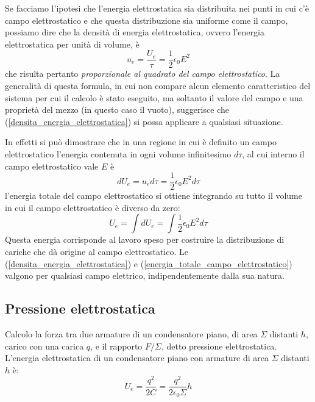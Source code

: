 \documentclass[class=book, crop=false, oneside, 12pt]{standalone}
\begin{document}
Se facciamo l'ipotesi che l'energia elettrostatica sia distribuita nei punti in cui c'è campo elettrostatico e che questa distribuzione sia uniforme come il campo, possiamo dire che la densità di energia elettrostatica, ovvero l'energia elettrostatica per unità di volume, è
\begin{equation} \label{densita_energia_elettrostatica}
    u_e = \frac{U_e}{\tau} = \frac{1}{2} \epsilon_0 E^2
\end{equation}
che risulta pertanto \emph{proporzionale al quadrato del campo elettrostatico}.  
La generalità di questa formula, in cui non compare alcun elemento caratteristico del sistema per cui il calcolo è stato eseguito, ma soltanto il valore del campo e una proprietà del mezzo (in questo caso il vuoto), suggerisce che (\ref{densita_energia_elettrostatica}) si possa applicare a qualsiasi situazione.

In effetti si può dimostrare che in una regione in cui è definito un campo elettrostatico l'energia contenuta in ogni volume infinitesimo \(d \tau\), al cui interno il campo elettrostatico vale \(E\) è 
\begin{equation*}
    d U_e = u_e d \tau = \frac{1}{2} \epsilon_0 E^2 d \tau
\end{equation*}
l'energia totale del campo elettrostatico si ottiene integrando su tutto il volume in cui il campo elettrostatico è diverso da zero: 
\begin{equation} \label{energia_totale_campo_elettrostatico}
    U_e = \int d U_e = \int \frac{1}{2} \epsilon_0 E^2 d \tau
\end{equation}
Questa energia corrisponde al lavoro speso per costruire la distribuzione di cariche che dà origine al campo elettrostatico. 
Le (\ref{densita_energia_elettrostatica}) e  (\ref{energia_totale_campo_elettrostatico}) valgono per qualsiasi campo elettrico, indipendentemente dalla sua natura.

\subsection{Pressione elettrostatica}

Calcolo la forza tra due armature di un condensatore piano, di area \(\Sigma\) distanti \(h\), carico con una carica \(q\), e il rapporto \(F/\Sigma\), detto pressione elettrostatica.  
L'energia elettrostatica di un condensatore piano con armature di area \(\Sigma\) distanti \(h\) è: 
\begin{equation*}
    U_e = \frac{q^2}{2 C} = \frac{q^2}{2 \epsilon_0 \Sigma} h
\end{equation*}
\end{document}
